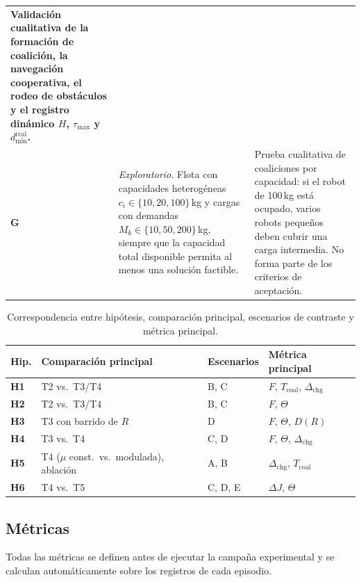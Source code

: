\begin{table}[htbp]
\begin{tabularx}{\textwidth}{@{}>{\bfseries\sffamily\color{VIUOrange}}p{} p{} Y@{}}
  Validación cualitativa de la formación de coalición, la navegación cooperativa,
  el rodeo de obstáculos y el registro dinámico $H$, $\tau_{\max}$ y
  $d_{\min}^{\mathrm{real}}$. \\
\addlinespace[2pt]
G &
  \emph{Exploratorio.} Flota con capacidades heterogéneas
  $c_i \in \{10,20,100\}$\,kg y cargas con demandas
  $M_k \in \{10,50,200\}$\,kg, siempre que la capacidad total disponible permita al
  menos una solución factible. &
  Prueba cualitativa de coaliciones por capacidad: si el robot de 100\,kg está ocupado,
  varios robots pequeños deben cubrir una carga intermedia. No forma parte de los
  criterios de aceptación. \\
\bottomrule
\end{tabularx}
\end{table}

\begin{table}[htbp]
\centering
\small
\caption[Hipótesis, comparaciones, escenarios y métricas]{Correspondencia entre
  hipótesis, comparación principal, escenarios de contraste y métrica principal.}
\label{tab:hipescenario}
\begin{tabularx}{\textwidth}{@{}>{\bfseries}p{}p{}p{}Y@{}}
\toprule
Hip. & Comparación principal & Escenarios & Métrica principal \\
\midrule
H1 & T2 vs.\ T3/T4 & B, C & $F$, $T_{\mathrm{coal}}$, $\Delta_{\mathrm{chg}}$ \\
H2 & T2 vs.\ T3/T4 & B, C & $F$, $\Theta$ \\
H3 & T3 con barrido de $R$ & D & $F$, $\Theta$, $D(R)$ \\
H4 & T3 vs.\ T4 & C, D & $F$, $\Theta$, $\Delta_{\mathrm{chg}}$ \\
H5 & T4 ($\mu$ const.\ vs.\ modulada), ablación & A, B &
  $\Delta_{\mathrm{chg}}$, $T_{\mathrm{coal}}$ \\
H6 & T4 vs.\ T5 & C, D, E & $\Delta J$, $\Theta$ \\
\bottomrule
\end{tabularx}
\end{table}

\subsection{Métricas}

Todas las métricas se definen antes de ejecutar la campaña experimental y se
calculan automáticamente sobre los registros de cada episodio.

